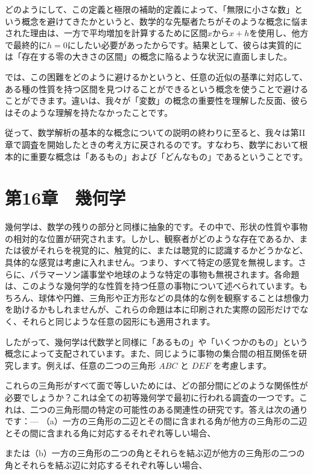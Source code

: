 \documentclass[a4paper,11pt,openany]{ltjsbook}
\begin{document}
どのようにして、この定義と極限の補助的定義によって、「無限に小さな数」という概念を避けてきたかというと、数学的な先駆者たちがそのような概念に悩まされた理由は、一方で平均増加を計算するために区間$x$から$x + h$を使用し、他方で最終的に$h = 0$にしたい必要があったからです。結果として、彼らは実質的には「存在する零の大きさの区間」の概念に陥るような状況に直面しました。

では、この困難をどのように避けるかというと、任意の近似の基準に対応して、ある種の性質を持つ区間を見つけることができるという概念を使うことで避けることができます。違いは、我々が「変数」の概念の重要性を理解した反面、彼らはそのような理解を持たなかったことです。

従って、数学解析の基本的な概念についての説明の終わりに至ると、我々は第II章で調査を開始したときの考え方に戻されるのです。すなわち、数学において根本的に重要な概念は「あるもの」および「どんなもの」であるということです。

\chapter{第16章　幾何学}

幾何学は、数学の残りの部分と同様に抽象的です。その中で、形状の性質や事物の相対的な位置が研究されます。しかし、観察者がどのような存在であるか、または彼がそれらを視覚的に、触覚的に、または聴覚的に認識するかどうかなど、具体的な感覚は考慮に入れません。つまり、すべて特定の感覚を無視します。さらに、パラマーソン議事堂や地球のような特定の事物も無視されます。各命題は、このような幾何学的な性質を持つ任意の事物について述べられています。もちろん、球体や円錐、三角形や正方形などの具体的な例を観察することは想像力を助けるかもしれませんが、これらの命題は本に印刷された実際の図形だけでなく、それらと同じような任意の図形にも適用されます。

したがって、幾何学は代数学と同様に「あるもの」や「いくつかのもの」という概念によって支配されています。また、同じように事物の集合間の相互関係を研究します。例えば、任意の二つの三角形 $ABC$ と $DEF$ を考慮します。

これらの三角形がすべて面で等しいためには、どの部分間にどのような関係性が必要でしょうか？これは全ての初等幾何学で最初に行われる調査の一つです。これは、二つの三角形間の特定の可能性のある関連性の研究です。答えは次の通りです：---
（a）一方の三角形の二辺とその間に含まれる角が他方の三角形の二辺とその間に含まれる角に対応するそれぞれ等しい場合、

または（b）一方の三角形の二つの角とそれらを結ぶ辺が他方の三角形の二つの角とそれらを結ぶ辺に対応するそれぞれ等しい場合、
\end{document}
